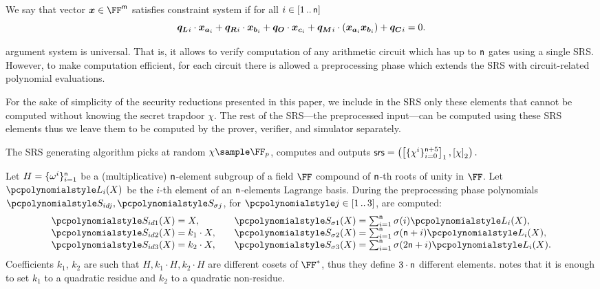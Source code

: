 We say that vector $\vx \in \FF^\noofw$ satisfies constraint system if for all $i
\in [1 \, .. \, \mathsf{n}]$
\[
  \vql_i \cdot \vx_{\va_i} + \vqr_i \cdot \vx_{\vb_i} + \vqo \cdot \vx_{\vc_i} +
  \vqm_i \cdot (\vx_{\va_i} \vx_{\vb_i}) + \vqc_i = 0. 
\]

\label{sec:plonk_explained}
\plonk{} argument system is universal. That is, it allows to verify computation
of any arithmetic circuit which has up to $\mathsf{n}$
gates using a single SRS. However, to make computation efficient, for each
circuit there is allowed a preprocessing phase which extends the SRS with
circuit-related polynomial evaluations.

For the sake of simplicity of the security reductions presented in this paper, we
include in the SRS only these elements that cannot be computed without knowing
the secret trapdoor $\chi$. The rest of the SRS---the preprocessed input---can
be computed using these SRS elements thus we leave them to be computed by the
prover, verifier, and simulator separately.

The SRS generating algorithm picks at random $\chi \sample \FF_p$, computes
and outputs
\(
	\mathsf{srs} = \left(\left[\{\chi^i\}_{i = 0}^{\mathsf{n} + 5}\right]_{1},
	\left[\chi\right]_{2} \right).
\)

Let $H = \{\omega^i\}_{i = 1}^{\mathsf{n} }$ be a
(multiplicative) $\mathsf{n}$-element subgroup of a field $\FF$
compound of $\mathsf{n}$-th roots of unity in $\FF$. Let $\lag_i(X)$ be
the $i$-th element of an $\mathsf{n}$-elements Lagrange basis. During
the preprocessing phase polynomials $\p{S_{id j}}, \p{S_{\sigma j}}$, for
$\p{j} \in \range{1}{3}$, are computed:
\begin{equation*}
  \begin{aligned}
    \p{S_{id 1}}(X) & = X,\\[\myskip]
    \p{S_{id 2}}(X) & = k_1 \cdot X,\\[\myskip]
    \p{S_{id 3}}(X) & = k_2 \cdot X,
  \end{aligned}
  \qquad
\begin{aligned}
  \p{S_{\sigma 1}}(X) & = {\textstyle{\sum_{i = 1}^{\noofc} \sigma(i) \lag_i(X)}},\\[\myskip]
  \p{S_{\sigma 2}}(X) & = {\textstyle \sum_{i = 1}^{\noofc}
  \sigma(\noofc + i) \lag_i(X)},\\[\myskip]
  \p{S_{\sigma 3}}(X) & ={\textstyle\sum_{i = 1}^{\noofc} \sigma(2 \noofc + i) \lag_i(X)}.
\end{aligned}
\end{equation*}
Coefficients $k_1$, $k_2$ are such that $H, k_1 \cdot H, k_2 \cdot H$ are
different cosets of $\FF^*$, thus they define $3 \cdot \mathsf{n}$
different elements. \cite{EPRINT:GabWilCio19} notes that it is enough to set
$k_1$ to a quadratic residue and $k_2$ to a quadratic non-residue.

